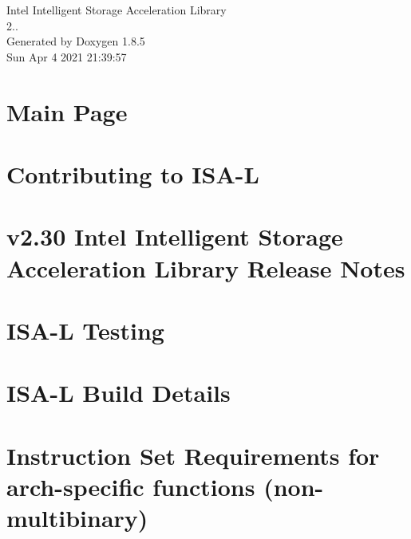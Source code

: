 \documentclass[twoside]{book}
\newcommand{\clearemptydoublepage}{%
  \newpage{\pagestyle{empty}\cleardoublepage}%
}
\begin{document}
\hypersetup{pageanchor=false}
\begin{titlepage}
\vspace*{7cm}
\begin{center}%
{\Large Intel Intelligent Storage Acceleration Library \\[1ex]\large 2.. }\\
\vspace*{1cm}
{\large Generated by Doxygen 1.8.5}\\
\vspace*{0.5cm}
{\small Sun Apr 4 2021 21:39:57}\\
\end{center}
\end{titlepage}
\clearemptydoublepage
\tableofcontents
\clearemptydoublepage
{}
\hypersetup{pageanchor=true}

\chapter{Main Page}
\label{index}\hypertarget{index}{}
\chapter{Contributing to I\-S\-A-\/\-L}
\label{md_CONTRIBUTING}
\hypertarget{md_CONTRIBUTING}{}

\chapter{v2.30 Intel Intelligent Storage Acceleration Library Release Notes}
\label{md_Release_notes}
\hypertarget{md_Release_notes}{}

\chapter{I\-S\-A-\/\-L Testing}
\label{md_doc_test}
\hypertarget{md_doc_test}{}

\chapter{I\-S\-A-\/\-L Build Details}
\label{md_doc_build}
\hypertarget{md_doc_build}{}

\chapter{Instruction Set Requirements for arch-\/specific functions (non-\/multibinary)}
\label{requires}
\hypertarget{requires}{}

\end{document}
